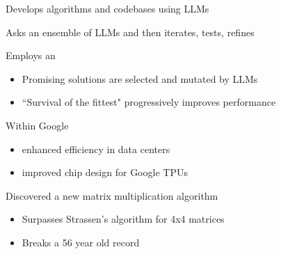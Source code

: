 \begin{frame}
    
    Develops algorithms and codebases using LLMs

    \vspace{0.5em}
    Asks an ensemble of LLMs and then iterates, tests, refines

    \vspace{0.5em}
    Employs an 

    \vspace{0.5em}
    \begin{itemize}
        \item Promising solutions are selected and mutated by LLMs 
        \vspace{0.5em}
        \item ``Survival of the fittest" progressively improves performance
    \end{itemize}

\end{frame}

\begin{frame}
    

    Within Google

    \begin{itemize}
        \item enhanced efficiency in data centers 
        \vspace{0.5em}
        \item improved chip design for Google TPUs 
        \vspace{0.5em}
    \end{itemize}

        \vspace{0.5em}
        \vspace{0.5em}
    Discovered a new matrix multiplication algorithm

    \begin{itemize}
        \item Surpasses Strassen's algorithm for 4x4 matrices
        \vspace{0.5em}
        \item Breaks a 56 year old record
    \end{itemize}

\end{frame}

